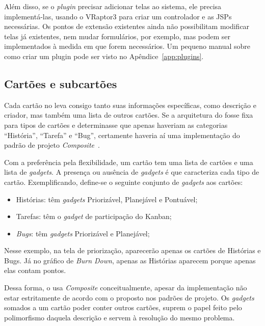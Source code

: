 Além disso, se o \textit{plugin} precisar adicionar telas ao sistema, ele precisa implementá-las, usando o VRaptor3 para criar um controlador e as JSPs necessárias. Os pontos de extensão existentes ainda não possibilitam modificar telas já existentes, nem mudar formulários, por exemplo, mas podem ser implementados à medida em que forem necessários. Um pequeno manual sobre como criar um plugin pode ser visto no Apêndice~\ref{app:plugins}.

\subsection{Cartões e subcartões}

Cada cartão no \calopsita{} leva consigo tanto suas informações específicas, como descrição e criador, mas também uma lista de outros cartões. Se a arquitetura do \calopsita{} fosse fixa para tipos de cartões e determinasse que apenas haveriam as categorias ``História'', ``Tarefa'' e ``Bug'', certamente haveria aí uma implementação do padrão de projeto \textit{Composite}~\cite{gof}.

Com a preferência pela flexibilidade, um cartão tem uma lista de cartões e uma lista de \textit{gadgets}. A presença ou ausência de \textit{gadgets} é que caracteriza cada tipo de cartão. Exemplificando, define-se o seguinte conjunto de \textit{gadgets} aos cartões:

\begin{itemize}
	\item{Histórias: têm \textit{gadgets} Priorizável, Planejável e Pontuável;}
	\item{Tarefas: têm o \textit{gadget} de participação do Kanban;}
	\item{\textit{Bugs}: têm \textit{gadgets} Priorizável e Planejável;}
\end{itemize}

Nesse exemplo, na tela de priorização, aparecerão apenas os cartões de Histórias e Bugs. Já no gráfico de \textit{Burn Down}, apenas as Histórias aparecem porque apenas elas contam pontos.

Dessa forma, o \calopsita{} usa \textit{Composite} conceitualmente, apesar da implementação não estar estritamente de acordo com o proposto nos padrões de projeto. Os \textit{gadgets} somados a um cartão poder conter outros cartões, suprem o papel feito pelo polimorfismo daquela descrição e servem à resolução do mesmo problema. 
